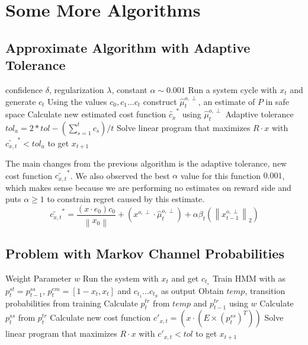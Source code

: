 \documentclass[BTech,thesis]{iitmdiss}
\newcommand{\norm}[1]{\left\lVert#1\right\rVert}
\begin{document}
\section{Some More Algorithms}
\subsection{Approximate Algorithm with Adaptive Tolerance}

\begin{algorithm}
\caption{}
\begin{algorithmic}
    \REQUIRE confidence $\delta$, regularization $\lambda$, constant $\alpha \sim 0.001$
        \STATE Run a system cycle with $x_t$ and generate $c_t$
        \STATE Using the values $c_0, c_1 ... c_t$ construct $\widehat{\mu}^{o,\perp}_t$, an estimate of $P$ in safe space
        \STATE Calculate new estimated cost function $\widetilde{c_x}^*$ using $\widehat{\mu}^{o,\perp}_t$
        \STATE Adaptive tolerance $tol_a = 2*tol - (\sum_{s=1}^t c_s)/t$
        \STATE Solve linear program that maximizes $R\cdot x$ with $\widetilde{c_{x,t}}^* < tol_a$ to get $x_{t+1}$
    \ENDFOR
\end{algorithmic}
\end{algorithm}

The main changes from the previous algorithm is the adaptive tolerance, new cost function $\widetilde{c_{x,t}}^*$. We also observed the best $\alpha$ value for this function $0.001$, which makes sense because we are performing no estimates on reward side and \cite{pan:pr:sblc} puts $\alpha \geq 1$ to constrain regret caused by this estimate. 
$$ \widetilde{c_{x,t}}^* = \frac{(x\cdot e_0)c_0}{\norm{x_0}} + (x^{o,\perp}\cdot \widehat{\mu}^{o,\perp}_t)  + \alpha\beta_t (\norm{x^{o,\perp}_{t-1}}_2) $$

\subsection{Problem with Markov Channel Probabilities}

\begin{algorithm}
\caption{}
\begin{algorithmic}
\REQUIRE Weight Parameter $w$
            \STATE Run the system with $x_t$ and get $c_{t_s}$
        \ENDFOR
        \STATE Train HMM with as $p^{st}_{t} = p^{ss}_{t-1}$, $p^{em}_{t} = [1-x_t,x_t]$ and $c_{t_1}...c_{t_S}$ as output
        \STATE Obtain $temp$, transition probabilities from training
        \STATE Calculate $p^{tr}_{t}$ from $temp$ and $p^{tr}_{t-1}$ using $w$
        \STATE Calculate $p^{ss}_{t}$ from $p^{tr}_{t}$
        \STATE Calculate new cost function $c'_{x,t} = (x\cdot (E\times (p^{ss}_{t})^T))$
        \STATE Solve linear program that maximizes $R\cdot x$ with $c'_{x,t} < tol$ to get $x_{t+1}$
    \ENDFOR
\end{algorithmic}
\end{algorithm}
\end{document}
